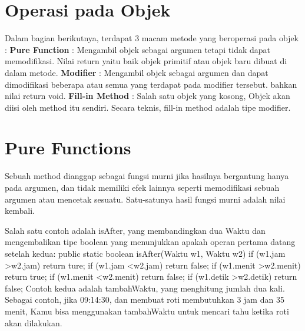 \section{Operasi pada Objek}

Dalam bagian berikutnya, terdapat 3 macam metode yang beroperasi pada objek : \newline
\textbullet \textbf{Pure Function} : Mengambil objek sebagai argumen tetapi tidak dapat memodifikasi. Nilai return yaitu baik objek primitif atau objek baru dibuat di dalam metode. \newline
\textbullet \textbf{Modifier} : Mengambil objek sebagai argumen dan dapat dimodifikasi beberapa atau semua yang terdapat pada modifier tersebut. bahkan nilai return void. \newline
\textbullet \textbf{Fill-in Method} : Salah satu objek yang kosong, Objek akan diisi oleh method itu sendiri. Secara teknis, fill-in method  adalah tipe modifier. \newline

\section{Pure Functions}

Sebuah method dianggap sebagai fungsi murni jika hasilnya bergantung hanya pada argumen, dan tidak memiliki efek lainnya seperti memodifikasi sebuah argumen atau mencetak sesuatu. Satu-satunya hasil fungsi murni adalah nilai kembali.

Salah satu contoh adalah isAfter, yang membandingkan dua Waktu dan mengembalikan tipe boolean yang menunjukkan apakah operan pertama datang setelah kedua:
\newline
public static boolean isAfter(Waktu w1, Waktu w2)\textbraceleft \newline
	if (w1.jam \textgreater w2.jam) \newline
		return ture; \newline
	if (w1.jam \textless w2.jam) \newline
		return false; \newline
\newline
	if (w1.menit \textgreater w2.menit) \newline
		return true; \newline
	if (w1.menit \textless w2.menit) \newline
		return false; \newline
\newline
	if (w1.detik \textgreater w2.detik) \newline
		return false; \newline
\textbraceright \newline
\newline
Contoh kedua adalah tambahWaktu, yang menghitung jumlah dua kali. Sebagai contoh, jika 09:14:30, dan membuat roti membutuhkan 3 jam dan 35 menit, Kamu bisa menggunakan tambahWaktu untuk mencari tahu ketika roti akan dilakukan.

